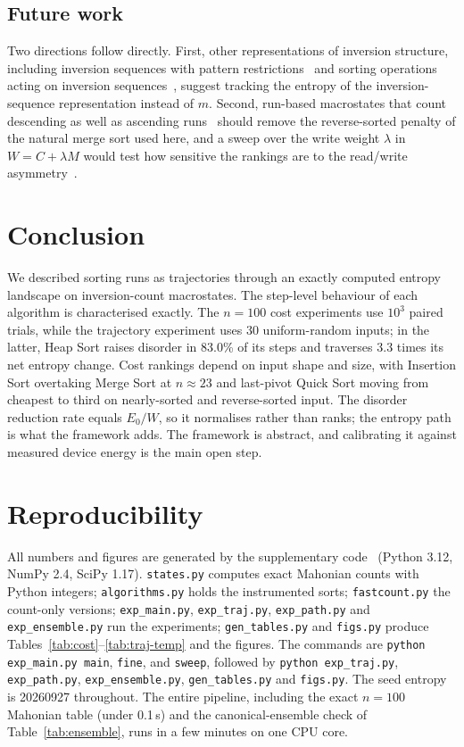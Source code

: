 \documentclass[10pt,journal]{IEEEtran}
\begin{document}
\subsection{Future work}
Two directions follow directly. First, other representations of inversion structure, including inversion sequences with pattern restrictions~\cite{ref24} and sorting operations acting on inversion sequences~\cite{ref30}, suggest tracking the entropy of the inversion-sequence representation instead of $m$. Second, run-based macrostates that count descending as well as ascending runs~\cite{ref5} should remove the reverse-sorted penalty of the natural merge sort used here, and a sweep over the write weight $\lambda$ in $W=C+\lambda M$ would test how sensitive the rankings are to the read/write asymmetry~\cite{ref19}.

\section{Conclusion}
We described sorting runs as trajectories through an exactly computed entropy landscape on inversion-count macrostates. The step-level behaviour of each algorithm is characterised exactly. The $n=100$ cost experiments use $10^3$ paired trials, while the trajectory experiment uses 30 uniform-random inputs; in the latter, Heap Sort raises disorder in 83.0\% of its steps and traverses $3.3$ times its net entropy change. Cost rankings depend on input shape and size, with Insertion Sort overtaking Merge Sort at $n\approx23$ and last-pivot Quick Sort moving from cheapest to third on nearly-sorted and reverse-sorted input. The disorder reduction rate equals $E_0/W$, so it normalises rather than ranks; the entropy path is what the framework adds. The framework is abstract, and calibrating it against measured device energy is the main open step.

\appendices
\section{Reproducibility}
All numbers and figures are generated by the supplementary code~\cite{ref35} (Python 3.12, NumPy 2.4, SciPy 1.17). \texttt{states.py} computes exact Mahonian counts with Python integers; \texttt{algorithms.py} holds the instrumented sorts; \texttt{fastcount.py} the count-only versions; \texttt{exp\_main.py}, \texttt{exp\_traj.py}, \texttt{exp\_path.py} and \texttt{exp\_ensemble.py} run the experiments; \texttt{gen\_tables.py} and \texttt{figs.py} produce Tables~\ref{tab:cost}--\ref{tab:traj-temp} and the figures. The commands are \texttt{python exp\_main.py main}, \texttt{fine}, and \texttt{sweep}, followed by \texttt{python exp\_traj.py}, \texttt{exp\_path.py}, \texttt{exp\_ensemble.py}, \texttt{gen\_tables.py} and \texttt{figs.py}. The seed entropy is 20260927 throughout. The entire pipeline, including the exact $n=100$ Mahonian table (under 0.1\,s) and the canonical-ensemble check of Table~\ref{tab:ensemble}, runs in a few minutes on one CPU core.
\end{document}
